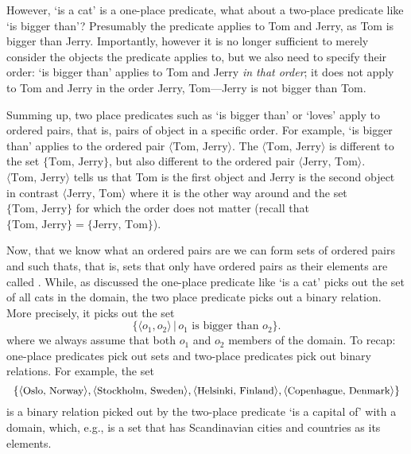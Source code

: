 However, `is a cat' is a one-place predicate, what about a two-place predicate like `is bigger than'?  Presumably the predicate applies to Tom and Jerry, as Tom is bigger than Jerry. Importantly, however it is no longer sufficient to merely consider the objects the predicate applies to, but we also need to specify their order: `is bigger than' applies to Tom and Jerry \emph{in that order}; it does not apply to Tom and Jerry in the order Jerry, Tom---Jerry is not bigger than Tom. 

Summing up, two place predicates such as `is bigger than' or `loves' apply to ordered pairs, that is, pairs of object in a specific order. For example, `is bigger than' applies to the ordered pair $\langle\text{Tom, Jerry}\rangle$. The  $\langle\text{Tom, Jerry}\rangle$ is different to the set $\{\text{Tom, Jerry}\}$, but also different to the ordered pair $\langle\text{Jerry, Tom}\rangle$. $\langle\text{Tom, Jerry}\rangle$ tells us that Tom is the first object and Jerry is the second object in contrast $\langle\text{Jerry, Tom}\rangle$ where it is the other way around and the set $\{\text{Tom, Jerry}\}$ for which the order does not matter (recall that $\{\text{Tom, Jerry}\}=\{\text{Jerry, Tom}\}$). 

Now, that we know what an ordered pairs are we can form sets of ordered pairs and such thats, that is, sets that only have ordered pairs as their elements are called . While, as discussed the one-place predicate like `is a cat' picks out the set of all cats in the domain, the two place predicate picks out a binary relation. More precisely, it picks out the set
$$\{\langle o_1,o_2\rangle\,|\,o_1\text{ is bigger than }o_2\}.$$
where we always assume that both $o_1$ and $o_2$ members of the domain. To recap: one-place predicates pick out sets and two-place predicates pick out binary relations. For example, the set
$${\small \{\langle\text{Oslo, Norway}\rangle,\langle\text{Stockholm, Sweden}\rangle,\langle\text{Helsinki, Finland}\rangle,\langle\text{Copenhague, Denmark}\rangle\}}$$
is a binary relation picked out by the two-place predicate `is a capital of' with a domain, which, e.g., is a set that has Scandinavian cities and countries as its elements.

